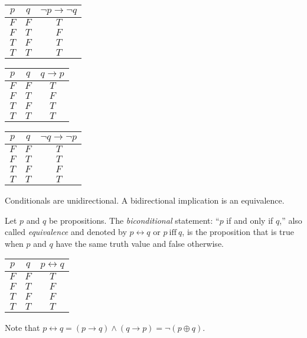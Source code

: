 \documentclass[letterpaper,12pt,fleqn]{article}
\renewcommand{\implies}{\rightarrow}
\renewcommand{\iff}{\leftrightarrow}
\newcommand{\lxor}{\oplus}
\begin{document}
\begin{minipage}{2in}
  \centering
  \begin{tabular}{cc|c}
    \(p\) & \(q\) & \(\lnot p\implies \lnot q\) \\
    \hline
    \(F\) & \(F\) & \(T\) \\
    \(F\) & \(T\) & \(F\) \\
    \(T\) & \(F\) & \(T\) \\
    \(T\) & \(T\) & \(T\) \\
  \end{tabular}
\end{minipage}
\begin{minipage}{2in}
  \centering
  \begin{tabular}{cc|c}
    \(p\) & \(q\) & \(q\implies p\) \\
    \hline
    \(F\) & \(F\) & \(T\) \\
    \(F\) & \(T\) & \(F\) \\
    \(T\) & \(F\) & \(T\) \\
    \(T\) & \(T\) & \(T\) \\
  \end{tabular}
\end{minipage}
\begin{minipage}{2in}
  \centering
  \begin{tabular}{cc|c}
    \(p\) & \(q\) & \(\lnot q\implies \lnot p\) \\
    \hline
    \(F\) & \(F\) & \(T\) \\
    \(F\) & \(T\) & \(T\) \\
    \(T\) & \(F\) & \(F\) \\
    \(T\) & \(T\) & \(T\) \\
  \end{tabular}
\end{minipage}

Conditionals are unidirectional.  A bidirectional implication is an equivalence.

\begin{definition}[Equivalence]
  Let \(p\) and \(q\) be propositions.  The \emph{biconditional} statement: ``\(p\) if and only if \(q\),'' also
  called \emph{equivalence} and denoted by \(p\iff q\) or \(p\ \text{iff}\ q\), is the proposition that is true
  when \(p\) and \(q\) have the same truth value and false otherwise.

  \begin{center}
    \begin{tabular}{|cc|c|}
      \hline
      \(p\) & \(q\) & \(p\iff q\) \\
      \hline
      \(F\) & \(F\) & \(T\) \\
      \hline
      \(F\) & \(T\) & \(F\) \\
      \hline
      \(T\) & \(F\) & \(F\) \\
      \hline
      \(T\) & \(T\) & \(T\) \\
      \hline
    \end{tabular}
  \end{center}

  Note that \(p\iff q=(p\implies q)\land(q\implies p)=\lnot(p\lxor q)\).
\end{definition}
\end{document}
